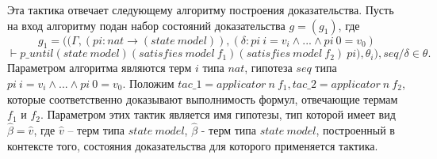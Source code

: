 \documentclass[12pt]{article}
\begin{document}
Эта тактика отвечает следующему алгоритму построения доказательства.
Пусть на вход алгоритму подан набор состояний доказательства $g = (g_1)$, где
$$g_1 = ((\Gamma,(pi:nat \xrightarrow{} (state\ model)), (\delta : pi\ i = v_i \wedge ... \wedge pi\ 0 = v_0) $$
$$\vdash p\_until (state\ model) (satisfies\ model\ f_1) (satisfies\ model\ f_2)\ pi), \theta_i),seq/\delta \in \theta.$$
Параметром алгоритма являются терм $i$ типа $nat$, гипотеза $seq$ типа $pi\ i = v_i \wedge ... \wedge pi\ 0 = v_0$.
Положим $tac\_1 = applicator\ n \ f_1, tac\_2 = applicator\ n \ f_2$, которые соответственно доказывают выполнимость формул, отвечающие термам $f_1$ и $f_2$. Параметром этих тактик является имя гипотезы, тип которой имеет вид   $\hat{\beta} = \hat{v}$, где $\hat{v}$ -- терм типа $state\ model$, $\hat{\beta}$ - терм типа $state\ model$, построенный в контексте того, состояния доказательства для которого применяется тактика.


\end{document}

